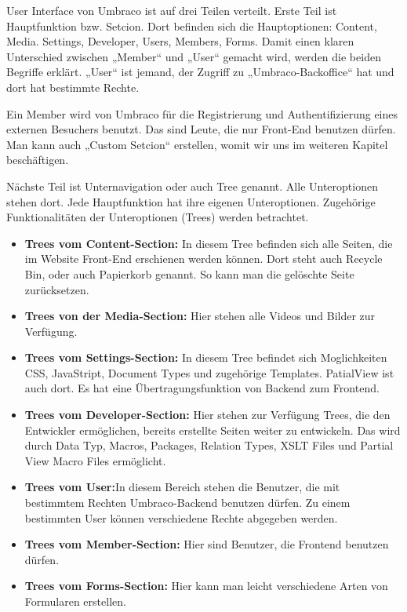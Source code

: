User Interface von Umbraco ist auf drei Teilen verteilt. Erste Teil ist Hauptfunktion bzw. Setcion. Dort befinden sich die Hauptoptionen: Content, Media. Settings, Developer, Users, Members, Forms.
Damit einen klaren Unterschied zwischen „Member“ und „User“ gemacht wird, werden die beiden Begriffe erklärt. „User“ ist jemand, der Zugriff zu „Umbraco-Backoffice“ hat und dort hat bestimmte Rechte. 

Ein Member wird von Umbraco für die Registrierung und Authentifizierung eines externen Besuchers benutzt. Das sind Leute, die nur Front-End benutzen dürfen. 
Man kann auch „Custom Setcion“ erstellen, womit wir uns im weiteren Kapitel beschäftigen. 

Nächste Teil ist Unternavigation oder auch Tree genannt. Alle Unteroptionen stehen dort. Jede Hauptfunktion hat ihre eigenen Unteroptionen.
Zugehörige Funktionalitäten der Unteroptionen (Trees) werden betrachtet.

\begin{itemize}	
	\item\textbf{Trees vom Content-Section:} In diesem Tree befinden sich alle Seiten, die im Website Front-End erschienen werden können. Dort steht auch Recycle Bin, oder auch Papierkorb genannt. So kann man die gelöschte Seite zurücksetzen. 
	\item\textbf{Trees von der Media-Section:} Hier stehen alle Videos und Bilder zur Verfügung.
	\item\textbf{Trees vom Settings-Section:} In diesem Tree befindet sich Moglichkeiten CSS, JavaStript, Document Types und zugehörige Templates. PatialView ist auch dort. Es hat eine Übertragungsfunktion von Backend zum Frontend.
	\item\textbf{Trees vom Developer-Section:} Hier stehen zur Verfügung Trees, die den Entwickler ermöglichen, bereits erstellte Seiten weiter zu entwickeln. Das wird durch Data Typ, Macros, Packages, Relation Types, XSLT Files und Partial View Macro Files ermöglicht.
	\item\textbf{Trees vom User:}In diesem Bereich stehen die Benutzer, die mit bestimmtem Rechten Umbraco-Backend benutzen dürfen. Zu einem bestimmten User können verschiedene Rechte abgegeben werden. 
	\item\textbf{Trees vom Member-Section:} Hier sind Benutzer, die Frontend benutzen dürfen.
	\item\textbf{Trees vom Forms-Section: } Hier kann man leicht verschiedene Arten von Formularen erstellen.		
\end{itemize}

